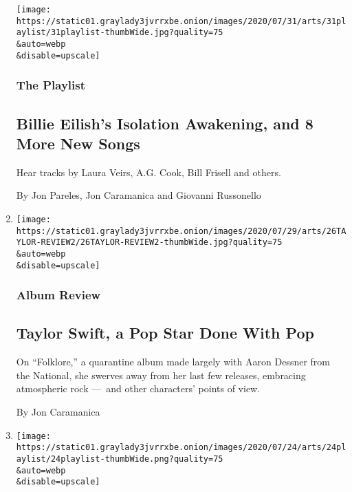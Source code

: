 \begin{enumerate}
  \texttt{[image: https://static01.graylady3jvrrxbe.onion/images/2020/07/31/arts/31playlist/31playlist-thumbWide.jpg?quality=75\\\&auto=webp\\\&disable=upscale]}

  \hypertarget{the-playlist-2}{%
  \subsubsection{The Playlist}\label{the-playlist-2}}

  \hypertarget{billie-eilishs-isolation-awakening-and-8-more-new-songs}{%
  \subsection{Billie Eilish's Isolation Awakening, and 8 More New
  Songs}\label{billie-eilishs-isolation-awakening-and-8-more-new-songs}}

  Hear tracks by Laura Veirs, A.G. Cook, Bill Frisell and others.

  By Jon Pareles, Jon Caramanica and Giovanni Russonello
\item
  \href{/2020/07/26/arts/music/taylor-swift-folklore-review.html}{}

  \texttt{[image: https://static01.graylady3jvrrxbe.onion/images/2020/07/29/arts/26TAYLOR-REVIEW2/26TAYLOR-REVIEW2-thumbWide.jpg?quality=75\\\&auto=webp\\\&disable=upscale]}

  \hypertarget{album-review}{%
  \subsubsection{Album Review}\label{album-review}}

  \hypertarget{taylor-swift-a-pop-star-done-with-pop}{%
  \subsection{Taylor Swift, a Pop Star Done With
  Pop}\label{taylor-swift-a-pop-star-done-with-pop}}

  On ``Folklore,'' a quarantine album made largely with Aaron Dessner
  from the National, she swerves away from her last few releases,
  embracing atmospheric rock ---~and other characters' points of view.

  By Jon Caramanica
\item
  \href{/2020/07/24/arts/music/playlist-taylor-swift-j-cole-drake.html}{}

  \texttt{[image: https://static01.graylady3jvrrxbe.onion/images/2020/07/24/arts/24playlist/24playlist-thumbWide.png?quality=75\\\&auto=webp\\\&disable=upscale]}


\end{enumerate}
